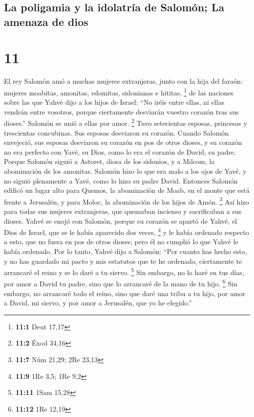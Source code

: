 \hypertarget{la-poligamia-y-la-idolatruxeda-de-salomuxf3n-la-amenaza-de-dios}{%
\subsection{La poligamia y la idolatría de Salomón; La amenaza de
dios}\label{la-poligamia-y-la-idolatruxeda-de-salomuxf3n-la-amenaza-de-dios}}

\hypertarget{section-10}{%
\section{11}\label{section-10}}

 El rey Salomón amó a muchas mujeres extranjeras, junto
con la hija del faraón: mujeres moabitas, amonitas, edomitas, sidonianas
e hititas, \footnote{\textbf{11:1} Deut 17,17}  de las
naciones sobre las que Yahvé dijo a los hijos de Israel: ``No iréis
entre ellas, ni ellas vendrán entre vosotros, porque ciertamente
desviarán vuestro corazón tras sus dioses.'' Salomón se unió a ellas por
amor. \footnote{\textbf{11:2} Éxod 34,16}  Tuvo
setecientas esposas, princesas y trescientas concubinas. Sus esposas
desviaron su corazón.  Cuando Salomón envejeció, sus
esposas desviaron su corazón en pos de otros dioses, y su corazón no era
perfecto con Yavé, su Dios, como lo era el corazón de David, su padre.
 Porque Salomón siguió a Astoret, diosa de los sidonios, y
a Milcom, la abominación de los amonitas.  Salomón hizo lo
que era malo a los ojos de Yavé, y no siguió plenamente a Yavé, como lo
hizo su padre David.  Entonces Salomón edificó un lugar
alto para Quemos, la abominación de Moab, en el monte que está frente a
Jerusalén, y para Moloc, la abominación de los hijos de Amón.
\footnote{\textbf{11:7} Núm 21,29; 2Re 23,13}  Así hizo
para todas sus mujeres extranjeras, que quemaban incienso y sacrificaban
a sus dioses.  Yahvé se enojó con Salomón, porque su
corazón se apartó de Yahvé, el Dios de Israel, que se le había aparecido
dos veces, \footnote{\textbf{11:9} 1Re 3,5; 1Re 9,2}  y
le había ordenado respecto a esto, que no fuera en pos de otros dioses;
pero él no cumplió lo que Yahvé le había ordenado.  Por
lo tanto, Yahvé dijo a Salomón: ``Por cuanto has hecho esto, y no has
guardado mi pacto y mis estatutos que te he ordenado, ciertamente te
arrancaré el reino y se lo daré a tu siervo. \footnote{\textbf{11:11}
  1Sam 15,28}  Sin embargo, no lo haré en tus días, por
amor a David tu padre, sino que lo arrancaré de la mano de tu hijo.
\footnote{\textbf{11:12} 1Re 12,19}  Sin embargo, no
arrancaré todo el reino, sino que daré una tribu a tu hijo, por amor a
David, mi siervo, y por amor a Jerusalén, que yo he elegido.''

